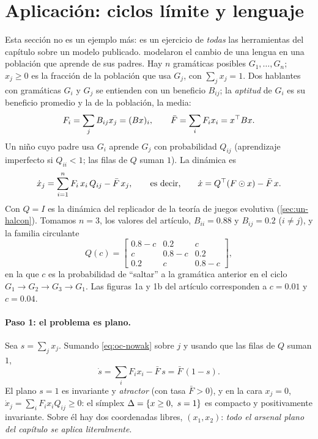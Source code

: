 \section{Aplicación: ciclos límite y lenguaje}
\label{sec:oc-nowak}

Esta sección no es un ejemplo más: es un ejercicio de \emph{todas} las herramientas del capítulo sobre un modelo publicado. \citet{MiNo04} modelaron el cambio de una lengua en una población que aprende de sus padres. Hay $n$ gramáticas posibles $G_1,\dots,G_n$; $x_j\ge0$ es la fracción de la población que usa $G_j$, con $\sum_jx_j=1$. Dos hablantes con gramáticas $G_i$ y $G_j$ se entienden con un beneficio $B_{ij}$; la \emph{aptitud} de $G_i$ es su beneficio promedio y la de la población, la media:
\[
  F_i=\sum_jB_{ij}x_j=(Bx)_i,\qquad\bar F=\sum_iF_ix_i=x^{\top} Bx .
\]
Un niño cuyo padre usa $G_i$ aprende $G_j$ con probabilidad $Q_{ij}$ (aprendizaje imperfecto si $Q_{ii}<1$; las filas de $Q$ suman $1$). La dinámica  es
\begin{equation}
  \dot x_j=\sum_{i=1}^nF_i\,x_i\,Q_{ij}-\bar F\,x_j,\qquad\text{es decir,}\qquad\dot x=Q^{\top}(F\odot x)-\bar F\,x .
  \label{eq:oc-nowak}
\end{equation}
Con $Q=I$ es la dinámica del replicador de la teoría de juegos evolutiva (\cref{sec:un-halcon}). Tomamos $n=3$, los valores del artículo, $B_{ii}=0.88$ y $B_{ij}=0.2$ ($i\neq j$), y la familia circulante
\[
  Q(c)=\begin{bmatrix}0.8-c&0.2&c\\ c&0.8-c&0.2\\ 0.2&c&0.8-c\end{bmatrix},
\]
en la que $c$ es la probabilidad de ``saltar'' a la gramática anterior en el ciclo $G_1\to G_2\to G_3\to G_1$. Las figuras 1a y 1b del artículo corresponden a $c=0.01$ y $c=0.04$.

\paragraph{Paso 1: el problema es plano.} Sea $s=\sum_jx_j$. Sumando \eqref{eq:oc-nowak} sobre $j$ y usando que las filas de $Q$ suman $1$,
\[
  \dot s=\sum_iF_ix_i-\bar F\,s=\bar F\,(1-s).
\]
El plano $s=1$ es invariante y \emph{atractor} (con tasa $\bar F>0$), y en la cara $x_j=0$, $\dot x_j=\sum_iF_ix_iQ_{ij}\ge0$: el símplex $\Delta=\{x\ge0,\ s=1\}$ es compacto y positivamente invariante. Sobre él hay dos coordenadas libres, $(x_1,x_2)$: \emph{todo el arsenal plano del capítulo se aplica literalmente}.

